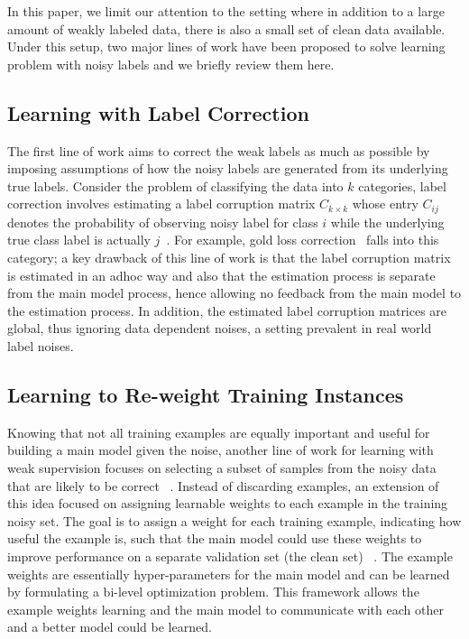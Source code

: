 In this paper, we limit our attention to the setting where in addition
to a large amount of weakly labeled data, there is also a small set of
clean data available.  Under this setup, two major lines of work have
been proposed to solve learning problem with noisy labels and we
briefly review them here.

\subsection{Learning with Label Correction}

The first line of work aims to correct the weak labels as much as
possible by imposing assumptions of how the noisy labels are generated
from its underlying true labels. Consider the problem of classifying
the data into $k$ categories, label correction involves estimating a
label corruption matrix $C_{k\times k}$ whose entry $C_{ij}$ denotes
the probability of observing noisy label for class $i$ while the
underlying true class label is actually
$j$~\cite{han2018masking,yao2020dual,xia2019anchor}. For example, gold
loss correction~\cite{hendrycks2018using} falls into this category; a
key drawback of this line of work is that the label corruption matrix
is estimated in an adhoc way and also that the estimation process is
separate from the main model process, hence allowing no feedback from
the main model to the estimation process. In addition, the estimated
label corruption matrices are global, thus ignoring data dependent
noises, a setting prevalent in real world label
noises\cite{xia2020part}.



\subsection{Learning to Re-weight Training Instances}

Knowing that not all training examples are equally important and
useful for building a main model given the noise, another line of work
for learning with weak supervision focuses on selecting a subset of
samples from the noisy data that are likely to be correct
~\cite{jiang2017mentornet,han2018co,pmlr-v97-yu19b,fang2020rethinking}. Instead of discarding examples,
an extension of this idea focused on assigning learnable weights to
each example in the training noisy set. The goal is to assign a weight
for each training example, indicating how useful the example is, such
that the main model could use these weights to improve performance on
a separate validation set (the clean set) ~\cite{ren2018learning, shu2019meta}. The
example weights are essentially hyper-parameters for the main model
and can be learned by formulating a bi-level optimization
problem. This framework allows the example weights learning and the
main model to communicate with each other and a better model could be
learned.


